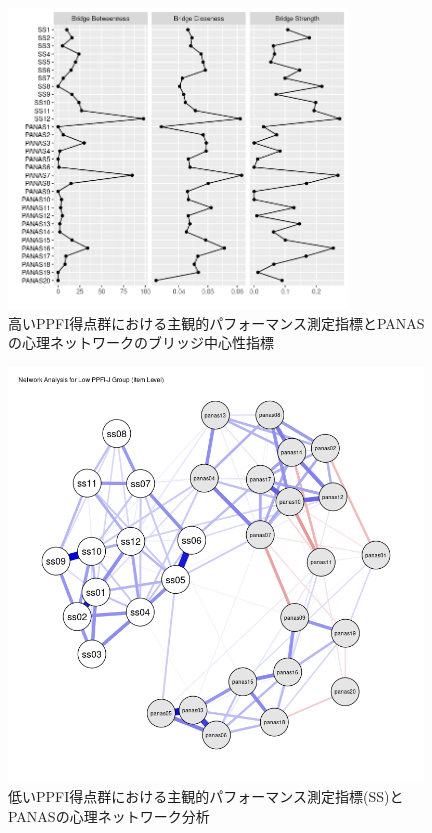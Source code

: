 \documentclass[12pt,a4paper,xelatex,ja=standard]{bxjsarticle}
\begin{document}
\begin{figure}[H]
\centering
\includegraphics[clip,width = 9cm]{figure/High_B.png}
\caption{高いPPFI得点群における主観的パフォーマンス測定指標とPANASの心理ネットワークのブリッジ中心性指標}
\end{figure}

\begin{figure}[H]
\centering
\includegraphics[clip,width = 11cm]{figure/Low_PPFI_J_Network.png}
\caption{低いPPFI得点群における主観的パフォーマンス測定指標(SS)とPANASの心理ネットワーク分析}
\end{figure}
\end{document}

